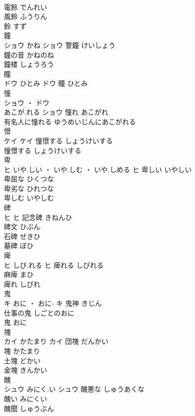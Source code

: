 \documentclass[8pt]{extreport}
\begin{document}
\begin{CJK}{UTF8}{min}
\\	電鈴	でんれい	
\\	風鈴	ふうりん	
\\	鈴	すず	
\\	鐘	
\\	ショウ	かね	ショウ	警鐘	けいしょう	
\\	鐘の音	かねのね	
\\	鐘楼	しょうろう	
\\	瞳	
\\	ドウ	ひとみ	ドウ													瞳	ひとみ	
\\	憧	
\\	ショウ ・ ドウ
\\	あこが.れる	ショウ	憧れ	あこがれ	
\\	有名人に憧れる	ゆうめいじんにあこがれる	
\\	憬	
\\	ケイ		ケイ	憧憬する	しょうけいする	
\\	憧憬する	しょうけいする	
\\	卑	
\\	ヒ	いや.しい ・ いや.しむ ・ いや.しめる	ヒ	卑しい	いやしい	
\\	卑屈な	ひくつな	
\\	卑劣な	ひれつな	
\\	卑しむ	いやしむ	
\\	碑	
\\	ヒ		ヒ	記念碑	きねんひ	
\\	碑文	ひぶん	
\\	石碑	せきひ	
\\	墓碑	ぼひ	
\\	痺	
\\	ヒ	しび.れる	ヒ	痺れる	しびれる	
\\	麻痺	まひ	
\\	痺れ	しびれ	
\\	鬼	
\\	キ	おに ・ おに-	キ	鬼神	きじん	
\\	仕事の鬼	しごとのおに	
\\	鬼	おに	
\\	塊	
\\	カイ	かたまり	カイ	団塊	だんかい	
\\	塊	かたまり	
\\	土塊	どかい	
\\	金塊	きんかい	
\\	醜	
\\	シュウ	みにく.い	シュウ	醜悪な	しゅうあくな	
\\	醜い	みにくい	
\\	醜聞	しゅうぶん	

\end{CJK}
\end{document}
